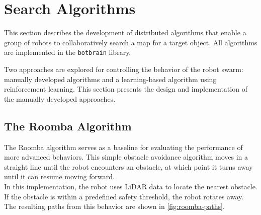 \section{Search Algorithms}
This section describes the development of distributed algorithms that enable a group of robots to collaboratively search a map for a target object. All algorithms are implemented in the \texttt{botbrain} library.

Two approaches are explored for controlling the behavior of the robot swarm: manually developed algorithms and a learning-based algorithm using reinforcement learning. This section presents the design and implementation of the manually developed approaches.

\subsection{The Roomba Algorithm}
The Roomba algorithm serves as a baseline for evaluating the performance of more advanced behaviors. This simple obstacle avoidance algorithm moves in a straight line until the robot encounters an obstacle, at which point it turns away until it can resume moving forward. \\

In this implementation, the robot uses LiDAR data to locate the nearest obstacle. If the obstacle is within a predefined safety threshold, the robot rotates away. The resulting paths from this behavior are shown in \cref{fig:roomba-paths}.

